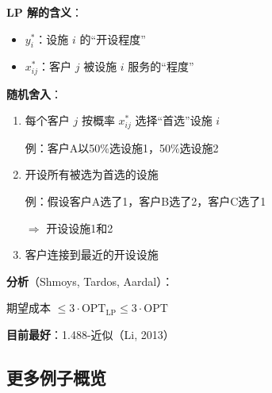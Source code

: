 \documentclass[12pt, a4paper]{ctexart}
\begin{document}
\begin{blackboard}

\textbf{LP 解的含义}：
\begin{itemize}
    \item $y_i^*$：设施 $i$ 的``开设程度''
    \item $x_{ij}^*$：客户 $j$ 被设施 $i$ 服务的``程度''
\end{itemize}

\textbf{随机舍入}：
\begin{enumerate}
    \item 每个客户 $j$ 按概率 $x_{ij}^*$ 选择``首选''设施 $i$
    
    例：客户A以50\%选设施1，50\%选设施2
    
    \item 开设所有被选为首选的设施
    
    例：假设客户A选了1，客户B选了2，客户C选了1
    
    $\Rightarrow$ 开设设施1和2
    
    \item 客户连接到最近的开设设施
\end{enumerate}

\textbf{分析}（Shmoys, Tardos, Aardal）：

期望成本 $\leq 3 \cdot \text{OPT}_{\text{LP}} \leq 3 \cdot \text{OPT}$

\textbf{目前最好}：1.488-近似（Li, 2013）

\end{blackboard}

\subsection{更多例子概览}
\end{document}
